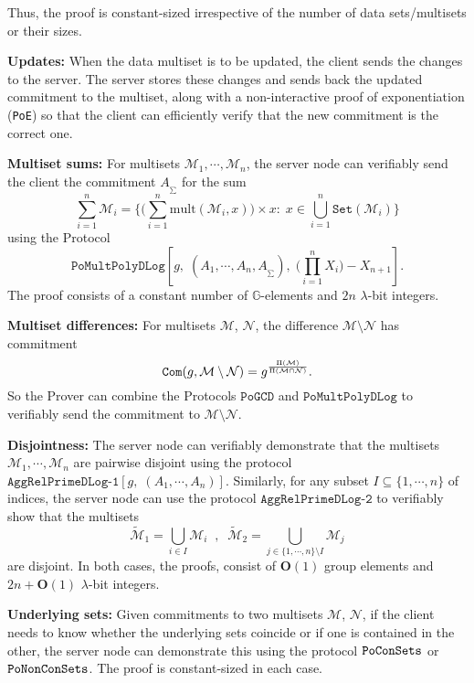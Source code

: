 \documentclass[11pt, lettersize, notitlepage, leqno, footskip=0.6cm]{article}
\newcommand{\pl}{\prod\limits}
\newcommand{\ttt}{\texttt}
\newcommand{\sett}{\ttt{Set}}
\newcommand{\mul}{\mr{mult}}
\newcommand{\wti}{\widetilde}
\newcommand{\mc}{\mathcal}
\newcommand{\mb}{\mathbb}
\newcommand{\mbf}{\mathbf}
\newcommand{\mr}{\mathrm}
\newcommand{\sm}{\setminus}
\newcommand{\lam}{\lambda}
\newcommand{\sub}{\subseteq}
\newcommand{\bO}{\mbf{O}}
\newcommand{\mcM}{\mc{M}}
\newcommand{\vs}{\vspace{-0.15cm}}
\newcommand{\noin}{\noindent}
\numberwithin{equation}{section}
\begin{document}
\noin Thus, the proof is constant-sized irrespective of the number of data sets/multisets or their sizes.



\vspace{0.2cm}

\noin \textbf{Updates:} When the data multiset is to be updated, the client sends the changes to the server. The server stores these changes and sends back the updated commitment to the multiset, along with a non-interactive proof of exponentiation (\verb|PoE|) so that the client can efficiently verify that the new commitment is the correct one. \vspace{0.15cm}

\noin \textbf{Multiset sums:} For multisets $\mc{M}_1,\cdots,\mc{M}_n$, the server node can verifiably send the client the commitment $A_{_{\sum}}$ for the sum \vs $$\sum\limits_{i=1}^n \mc{M}_i = \Big\{\big(\sum\limits_{i=1}^n \mul(\mc{M}_i, x)\big)\times x:\; x\in\bigcup\limits_{i=1}^n \sett(\mc{M}_i)\Big\} $$ using the Protocol \vspace{-0.3cm} $$\ttt{PoMultPolyDLog}[g,\; (A_1,\cdots,A_n,A_{_{\sum}}),\;\big(\pl_{i=1}^{n}X_i\big)-X_{n+1}].$$ The proof consists of a constant number of $\mb{G}$-elements and $2n$ $\lam$-bit integers.

\bigskip

\noin \textbf{Multiset differences:} For multisets $\mc{M}$, $\mc{N}$, the difference $\mc{M}\sm \mc{N} $ has commitment \vs $$\protect{\verb|Com|}(g, \mc{M}\sm \mc{N}) = g^{\frac{\Pi(\mcM)}{\Pi(\mcM\cap \mc{N})}} .$$ So the Prover can combine the Protocols $\ttt{PoGCD}$ and $\ttt{PoMultPolyDLog}$ to verifiably send the commitment to $\mc{M}\sm \mc{N} $. 

\bigskip


\noin \textbf{Disjointness:} The server node can verifiably demonstrate that the multisets $\mcM_1,\cdots,\mcM_n$ are pairwise disjoint using the protocol $\ttt{AggRelPrimeDLog-1}[g,\;(A_1,\cdots,A_n)]$. Similarly, for any subset $I\sub\{1,\cdots,n \}$ of indices, the server node can use the protocol $\ttt{AggRelPrimeDLog-2}$ to verifiably show that the multisets \vs $$\wti{\mcM}_1 = \bigcup\limits_{i\in I}\mcM_i\;\;,\;\;\wti{\mcM}_2 = \bigcup\limits_{j\in \{1,\cdots,n\}\sm I}\mcM_j $$ are disjoint. In both cases, the proofs, consist of $\bO(1)$ group elements and $2n+\bO(1)$ $\lam$-bit integers.

\bigskip

\noin \textbf{Underlying sets:} Given commitments to two multisets $\mc{M}$, $\mc{N}$, if the client needs to know whether the underlying sets coincide or if one is contained in the other, the server  node can demonstrate this using the protocol $\tt{PoConSets}$ or  $\tt{PoNonConSets}$. The proof is constant-sized in each case.
\end{document}
